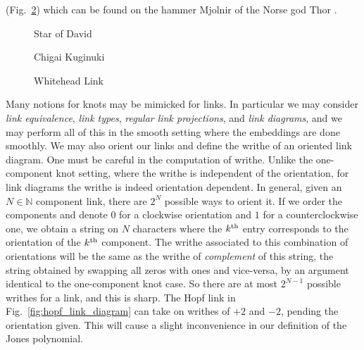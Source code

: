         (Fig.~\ref{fig:whitehead_link}) which can be found on the
        hammer Mjolnir of the Norse god Thor
        \cite[p.~309]{MonteliusMjolnirHopfLink}.
        \begin{figure}
            \centering
            \begin{minipage}[b]{0.49\textwidth}
                \centering
                \caption{Star of David}
                \label{fig:hopf_link_star_of_david}
            \end{minipage}
            \hfill
            \begin{minipage}[b]{0.49\textwidth}
                \centering
                \vspace{2em}
                \caption{Chigai Kuginuki}
                \label{fig:hopf_link_chigai_kuginuki}
            \end{minipage}
        \end{figure}
        \begin{figure}
            \centering
            \caption{Whitehead Link}
            \label{fig:whitehead_link}
        \end{figure}
        \par\hfill\par
        Many notions for knots may be mimicked for links. In particular we may
        consider \textit{link equivalence}, \textit{link types},
        \textit{regular link projections}, and \textit{link diagrams}, and we
        may perform all of this in the smooth setting where the embeddings are
        done smoothly. We may also orient our links and define the
        writhe of an oriented link
        diagram. One must be careful in the computation of writhe. Unlike the
        one-component knot setting, where the writhe is independent of the
        orientation, for link diagrams the writhe is indeed orientation
        dependent. In general, given an $N\in\mathbb{N}$ component link,
        there are $2^{N}$ possible ways to orient it. If we order the
        components and denote $0$ for a clockwise orientation and $1$ for a
        counterclockwise one, we obtain a string on $N$ characters where the
        $k^{\small\textrm{th}}$ entry corresponds to the orientation of the
        $k^{\small\textrm{th}}$ component. The writhe associated to this
        combination of orientations will be the same as the writhe of
        \textit{complement} of this string, the string obtained by swapping all
        zeros with ones and vice-versa, by an argument identical to the
        one-component knot case. So there are at most $2^{N-1}$ possible writhes
        for a link, and this is sharp. The Hopf link in
        Fig.~\ref{fig:hopf_link_diagram} can take on writhes of $+2$ and $-2$,
        pending the orientation given. This will cause a slight inconvenience
        in our definition of the Jones polynomial.
